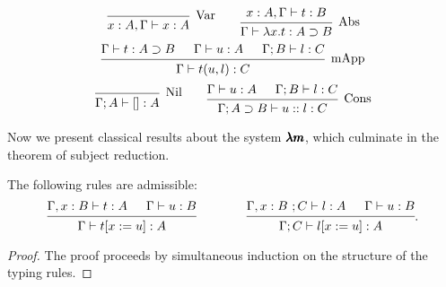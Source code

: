 \begin{definition}
  \[
    \begin{prooftree}
      \infer0[Var]{ x:A, \Gamma \vdash x:A } 
    \end{prooftree}
    \qquad
    \begin{prooftree}
      \hypo{ x:A, \Gamma \vdash t:B }
      \infer1[Abs]{ \Gamma \vdash \lambda x . t : A \supset B  } 
    \end{prooftree}
  \]
  \[
    \begin{prooftree}
      \hypo{ \Gamma \vdash t : A \supset B }
      \hypo{ \Gamma \vdash u : A }
      \hypo{ \Gamma ; B \vdash l : C }	
      \infer3[mApp]{ \Gamma \vdash t(u, l) : C } 
    \end{prooftree}
  \]
  \[
    \begin{prooftree}
      \infer0[Nil]{ \Gamma ; A \vdash []:A } 
    \end{prooftree}
    \qquad
    \begin{prooftree}
      \hypo{ \Gamma \vdash u:A }
      \hypo{ \Gamma ; B \vdash l:C }
      \infer2[Cons]{ \Gamma ; A \supset B \vdash  u::l : C } 
    \end{prooftree}
  \]
\end{definition}


Now we present classical results about the system $\pmb{\lambda m}$, which culminate in the theorem of subject reduction.

\begin{lemma}%
  \label{type_substitution}
  The following rules are admissible:
  \[
    \begin{prooftree}
      \hypo{ \Gamma , x:B \vdash t:A }
      \hypo{ \Gamma \vdash u:B }
      \infer2{ \Gamma \vdash  t[x := u] : A }      
    \end{prooftree}
    \qquad \qquad
    \begin{prooftree}
      \hypo{ \Gamma , x:B \ ; C \vdash l:A }
      \hypo{ \Gamma \vdash u:B }
      \infer2{ \Gamma ; C \vdash  l[x := u] : A }
    \end{prooftree}.
  \]
\end{lemma}
\begin{proof}
  The proof proceeds by simultaneous induction on the structure of the typing rules.
\end{proof}

